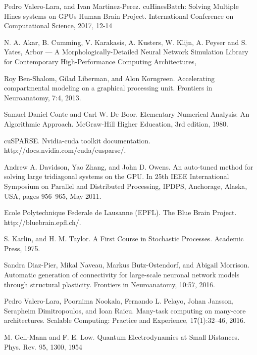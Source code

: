 \clearpage
\newpage
{} %
\begin{thebibliography}{1}
  Pedro Valero-Lara, and Ivan Martinez-Perez.
  cuHinesBatch: Solving Multiple Hines systems on GPUs Human Brain Project. 
  International Conference on Computational 
  Science, 2017, 12-14

  N. A. Akar, B. Cumming, V. Karakasis, A. Kusters, W. Klijn, A. Peyser and S. Yates,
  Arbor --- A Morphologically-Detailed Neural Network Simulation Library for Contemporary High-Performance Computing Architectures,

  Roy Ben-Shalom, Gilad Liberman, and Alon Korngreen. Accelerating compartmental modeling
  on a graphical processing unit. Frontiers in Neuroanatomy, 7:4, 2013.

  Samuel Daniel Conte and Carl W. De Boor. Elementary Numerical Analysis: An Algorithmic
  Approach. McGraw-Hill Higher Education, 3rd edition, 1980.

  cuSPARSE. Nvidia-cuda toolkit documentation. http://docs.nvidia.com/cuda/cusparse/.

  Andrew A. Davidson, Yao Zhang, and John D. Owens. An auto-tuned method for solving large
tridiagonal systems on the GPU. In 25th IEEE International Symposium on Parallel and Distributed
  Processing, IPDPS, Anchorage, Alaska, USA, pages 956–965, May 2011.
  
  Ecole Polytechnique Federale de Lausanne (EPFL). The Blue Brain Project.
  http://bluebrain.epfl.ch/.

  S. Karlin, and H. M. Taylor. A First Course in Stochastic Processes. Academic Press, 1975.

  Sandra Diaz-Pier, Mikal Naveau, Markus Butz-Ostendorf, and Abigail Morrison. Automatic generation
  of connectivity for large-scale neuronal network models through structural plasticity. Frontiers
  in Neuroanatomy, 10:57, 2016.

  Pedro Valero-Lara, Poornima Nookala, Fernando L. Pelayo, Johan Jansson, Serapheim Dimitropoulos,
  and Ioan Raicu. Many-task computing on many-core architectures. Scalable Computing:
  Practice and Experience, 17(1):32–46, 2016.

  M. Gell-Mann and F. E. Low. Quantum Electrodynamics at Small Distances. Phys. Rev. 95, 1300, 1954


\end{thebibliography}
